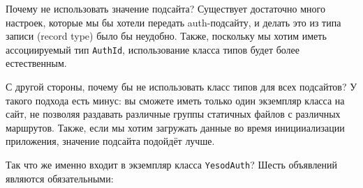 \begin{remark}
Почему не использовать значение подсайта? Существует достаточно много настроек, которые мы бы хотели передать auth-подсайту, и делать это из типа записи (record type) было бы неудобно. Также, поскольку мы хотим иметь ассоциируемый тип \lstinline'AuthId', использование класса типов будет более естественным.

С другой стороны, почему бы не использовать класс типов для всех подсайтов? У такого подхода есть минус: вы сможете иметь только один экземпляр класса на сайт, не позволяя раздавать различные группы статичных файлов с различных маршрутов. Также, если мы хотим загружать данные во время иницииализации приложения, значение подсайта подойдёт лучше.
\end{remark}

Так что же именно входит в экземпляр класса \lstinline'YesodAuth'? Шесть объявлений являются обязательными:

